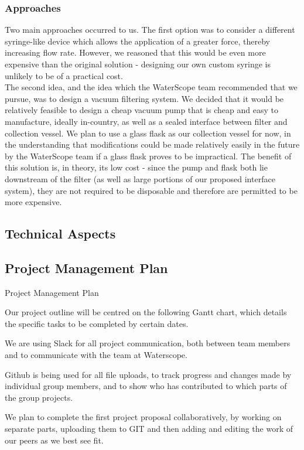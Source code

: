 \documentclass[12pt]{article}
\begin{document}
\subsubsection{Approaches}
Two main approaches occurred to us. The first option was to consider a different syringe-like device which allows the application of a greater force, thereby increasing flow rate. However, we reasoned that this would be even more expensive than the original solution - designing our own custom syringe is unlikely to be of a practical cost.\\
The second idea, and the idea which the WaterScope team recommended that we pursue, was to design a vacuum filtering system. We decided that it would be relatively feasible to design a cheap vacuum pump that is cheap and easy to manufacture, ideally in-country, as well as a sealed interface between filter and collection vessel. We plan to use a glass flask as our collection vessel for now, in the understanding that modifications could be made relatively easily in the future by the WaterScope team if a glass flask proves to be impractical. The benefit of this solution is, in theory, its low cost - since the pump and flask both lie downstream of the filter (as well as large portions of our proposed interface system), they are not required to be disposable and therefore are permitted to be more expensive.
\subsection{Technical Aspects}

\subsection{Project Management Plan}
Project Management Plan

Our project outline will be centred on the following Gantt chart, which details the specific tasks to be completed by certain dates. 

We are using Slack for all project communication, both between team members and to communicate with the team at Waterscope. 

Github is being used for all file uploads, to track progress and changes made by individual group members, and to show who has contributed to which parts of the group projects.

We plan to complete the first project proposal collaboratively, by working on separate parts, uploading them to GIT and then adding and editing the work of our peers as we best see fit.
\end{document}
